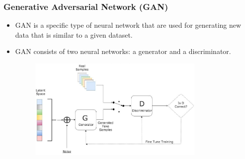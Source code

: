 \begin{frame}
\frametitle{Generative Adversarial Network (GAN)}
\begin{itemize}
\item GAN is a specific type of neural network that are used for generating new data that is similar to a given dataset.
\item GAN consists of two neural networks: a generator and a discriminator.
\begin{figure}[h]
\centering
\includegraphics[width=0.8\textwidth]{figures/gan.jpeg}
\end{figure}
\end{itemize}
\end{frame}
